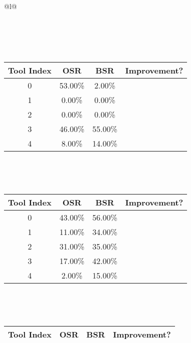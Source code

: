 \begin{longtable}{@{}l@{}}
\begin{minipage}{\textwidth}
\begin{tabular}{|c|c|c|c|}
\end{tabular}
\end{minipage}\\[2ex]
\begin{minipage}{\textwidth}
\centering\vspace{2ex}
\\[0.8ex]
\begin{tabular}{|c|c|c|c|} \hline
\textbf{Tool Index} & \textbf{OSR} & \textbf{ BSR} & \textbf{Improvement?} \\ \hline
0 & 53.00\% & 2.00\% & \textcolor{red}{\ding{55}} \\ \hline
1 & 0.00\% & 0.00\% & \textcolor{red}{\ding{55}} \\ \hline
2 & 0.00\% & 0.00\% & \textcolor{red}{\ding{55}} \\ \hline
3 & 46.00\% & 55.00\% & \textcolor{green}{\ding{51}} \\ \hline
4 & 8.00\% & 14.00\% & \textcolor{green}{\ding{51}} \\ \hline
\end{tabular}
\end{minipage}\\[2ex]
\begin{minipage}{\textwidth}
\centering\vspace{2ex}
\\[0.8ex]
\begin{tabular}{|c|c|c|c|} \hline
\textbf{Tool Index} & \textbf{OSR} & \textbf{ BSR} & \textbf{Improvement?} \\ \hline
0 & 43.00\% & 56.00\% & \textcolor{green}{\ding{51}} \\ \hline
1 & 11.00\% & 34.00\% & \textcolor{green}{\ding{51}} \\ \hline
2 & 31.00\% & 35.00\% & \textcolor{green}{\ding{51}} \\ \hline
3 & 17.00\% & 42.00\% & \textcolor{green}{\ding{51}} \\ \hline
4 & 2.00\% & 15.00\% & \textcolor{green}{\ding{51}} \\ \hline
\end{tabular}
\end{minipage}\\[2ex]
\begin{minipage}{\textwidth}
\centering\vspace{2ex}
\\[0.8ex]
\begin{tabular}{|c|c|c|c|} \hline
\textbf{Tool Index} & \textbf{OSR} & \textbf{ BSR} & \textbf{Improvement?} \\ \hline

\end{tabular}
\end{minipage}
\end{longtable}
